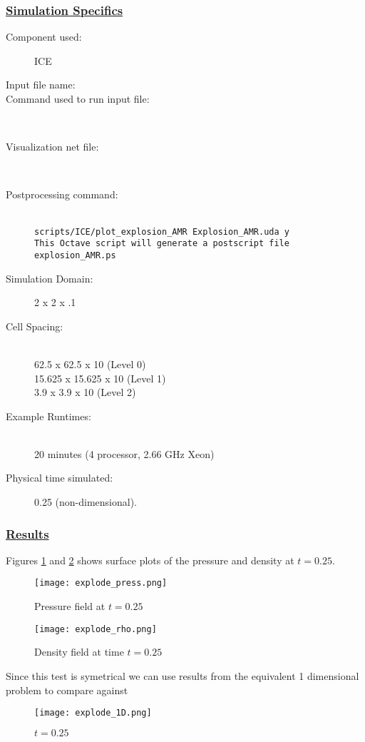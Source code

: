 \subsubsection*{\underline{Simulation Specifics}}
\begin{description} 
\item [Component used:] \hfill ICE
\item [Input file name:] \hfill {}
\item [Command used to run input file:]\hfill \\
\item [Visualization net file:]\hfill {}\\
\item [Postprocessing command:]\hfill \\
\tt scripts/ICE/plot\_explosion\_AMR Explosion\_AMR.uda y \normalfont \\
This Octave script will generate a postscript file explosion\_AMR.ps


\item [Simulation Domain:]\hfill    2 x 2 x .1
\item [Cell Spacing:]\hfill \\ 
62.5    x 62.5    x 10 (Level 0)\\
15.625  x 15.625  x 10 (Level 1)\\
3.9     x 3.9     x 10 (Level 2)

\item [Example Runtimes:] \hfill \\
 20 minutes   (4 processor, 2.66 GHz Xeon)

\item [Physical time simulated:] \hfill 0.25 (non-dimensional).

\end{description}

\subsubsection*{\underline{Results}}
Figures \ref{fig:pressExplode} and \ref{fig:rhoExplode} shows surface plots of the pressure and density at $t=0.25.$  
\begin{figure}
 \texttt{[image: explode\_press.png]}
\caption{Pressure field at $t=0.25$}
\label{fig:pressExplode}
\end{figure}
%
\begin{figure}
  \texttt{[image: explode\_rho.png]}
  \caption{Density field at time $t=0.25$}
  \label{fig:rhoExplode}
\end{figure}
%
Since this test is symetrical we can use results from the equivalent 1 dimensional problem to compare against
%
\begin{figure}
  \texttt{[image: explode\_1D.png]}
  \caption{$t=0.25$}
  \label{fig:1dExplode}
\end{figure}
\newpage

